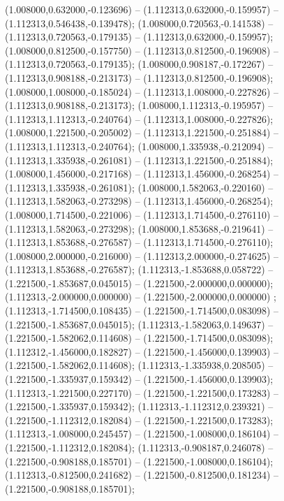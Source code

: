  (1.008000,0.632000,-0.123696) -- (1.112313,0.632000,-0.159957) -- (1.112313,0.546438,-0.139478);
 (1.008000,0.720563,-0.141538) -- (1.112313,0.720563,-0.179135) -- (1.112313,0.632000,-0.159957);
 (1.008000,0.812500,-0.157750) -- (1.112313,0.812500,-0.196908) -- (1.112313,0.720563,-0.179135);
 (1.008000,0.908187,-0.172267) -- (1.112313,0.908188,-0.213173) -- (1.112313,0.812500,-0.196908);
 (1.008000,1.008000,-0.185024) -- (1.112313,1.008000,-0.227826) -- (1.112313,0.908188,-0.213173);
 (1.008000,1.112313,-0.195957) -- (1.112313,1.112313,-0.240764) -- (1.112313,1.008000,-0.227826);
 (1.008000,1.221500,-0.205002) -- (1.112313,1.221500,-0.251884) -- (1.112313,1.112313,-0.240764);
 (1.008000,1.335938,-0.212094) -- (1.112313,1.335938,-0.261081) -- (1.112313,1.221500,-0.251884);
 (1.008000,1.456000,-0.217168) -- (1.112313,1.456000,-0.268254) -- (1.112313,1.335938,-0.261081);
 (1.008000,1.582063,-0.220160) -- (1.112313,1.582063,-0.273298) -- (1.112313,1.456000,-0.268254);
 (1.008000,1.714500,-0.221006) -- (1.112313,1.714500,-0.276110) -- (1.112313,1.582063,-0.273298);
 (1.008000,1.853688,-0.219641) -- (1.112313,1.853688,-0.276587) -- (1.112313,1.714500,-0.276110);
 (1.008000,2.000000,-0.216000) -- (1.112313,2.000000,-0.274625) -- (1.112313,1.853688,-0.276587);
 (1.112313,-1.853688,0.058722) -- (1.221500,-1.853687,0.045015) -- (1.221500,-2.000000,0.000000);
 (1.112313,-2.000000,0.000000) -- (1.221500,-2.000000,0.000000) ;
 (1.112313,-1.714500,0.108435) -- (1.221500,-1.714500,0.083098) -- (1.221500,-1.853687,0.045015);
 (1.112313,-1.582063,0.149637) -- (1.221500,-1.582062,0.114608) -- (1.221500,-1.714500,0.083098);
 (1.112312,-1.456000,0.182827) -- (1.221500,-1.456000,0.139903) -- (1.221500,-1.582062,0.114608);
 (1.112313,-1.335938,0.208505) -- (1.221500,-1.335937,0.159342) -- (1.221500,-1.456000,0.139903);
 (1.112313,-1.221500,0.227170) -- (1.221500,-1.221500,0.173283) -- (1.221500,-1.335937,0.159342);
 (1.112313,-1.112312,0.239321) -- (1.221500,-1.112312,0.182084) -- (1.221500,-1.221500,0.173283);
 (1.112313,-1.008000,0.245457) -- (1.221500,-1.008000,0.186104) -- (1.221500,-1.112312,0.182084);
 (1.112313,-0.908187,0.246078) -- (1.221500,-0.908188,0.185701) -- (1.221500,-1.008000,0.186104);
 (1.112313,-0.812500,0.241682) -- (1.221500,-0.812500,0.181234) -- (1.221500,-0.908188,0.185701);
